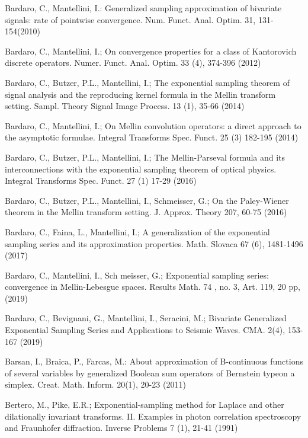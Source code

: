 \documentclass[12pt]{article}
\begin{document}
{\begin{thebibliography}{99}
 Bardaro, C., Mantellini, I.: Generalized sampling approximation of bivariate signals: rate of pointwise convergence. Num. Funct. Anal. Optim. 31, 131-154(2010)

 Bardaro, C., Mantellini, I.; On convergence properties for a class of Kantorovich discrete operators. Numer. Funct. Anal. Optim. 33 (4), 374-396 (2012)

 Bardaro, C., Butzer, P.L., Mantellini, I.; The exponential sampling theorem of signal analysis and the reproducing kernel formula in the Mellin transform setting. Sampl. Theory Signal Image Process. 13 (1), 35-66 (2014)

 Bardaro, C., Mantellini, I.; On Mellin convolution operators: a direct approach to the asymptotic formulae. Integral Transforms Spec. Funct. 25 (3) 182-195 (2014)

 Bardaro, C., Butzer, P.L., Mantellini, I.; The Mellin-Parseval formula and its interconnections with the exponential sampling theorem of optical physics. Integral Transforms Spec. Funct. 27 (1) 17-29 (2016)

 Bardaro, C., Butzer, P.L., Mantellini, I., Schmeisser, G.; On the Paley-Wiener theorem in the Mellin transform setting. J. Approx. Theory 207, 60-75 (2016)

 Bardaro, C., Faina, L., Mantellini, I.; A generalization of the exponential sampling series and its approximation properties. Math. Slovaca 67 (6), 1481-1496 (2017)

 Bardaro, C., Mantellini, I., Sch meisser, G.; Exponential sampling series: convergence in Mellin-Lebesgue spaces. Results Math. 74 , no. 3, Art. 119, 20 pp, (2019)

 Bardaro, C., Bevignani, G., Mantellini, I., Seracini, M.; Bivariate Generalized Exponential Sampling Series and Applications to Seismic Waves. CMA. 2(4), 153-167 (2019)

 Barsan, I., Braica, P., Farcas, M.: About approximation of B-continuous functions of several variables by generalized Boolean sum operators of Bernstein typeon a simplex. Creat. Math. Inform. 20(1), 20-23 (2011)

 Bertero, M., Pike, E.R.; Exponential-sampling method for Laplace and other dilationally invariant transforms. II. Examples in photon correlation spectroscopy and Fraunhofer diffraction. Inverse Problems 7 (1), 21-41 (1991)



\end{thebibliography}}
\end{document}
